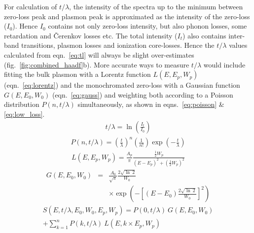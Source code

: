 \documentclass[%
aip,
rsi,%
 amsmath,amssymb,%
 reprint,%
]{revtex4-1}
\begin{document}
For calculation of $t/\lambda$, the intensity of the spectra up to the minimum between zero-loss peak and plasmon peak is approximated as the intensity of the zero-loss ($I_0$). Hence $I_0$ contains not only zero-loss intensity, but also phonon losses, some retardation and \v{C}erenkov losses etc. The total intensity ($I_t$) also contains inter-band transitions, plasmon losses and ionization core-losses. Hence the $t/\lambda$ values calculated from eqn.~\ref{eq:tl} will always be slight over-estimates (fig.~\ref{fig:combined_haadf}b). More accurate ways to measure $t/\lambda$ would include fitting the bulk plasmon with a Lorentz function $L(E,E_p,W_p)$ (eqn.~\ref{eq:lorentz}) and the monochromated zero-loss with a Gaussian function $G(E,E_0,W_0)$ (eqn.~\ref{eq:gauss}) and weighting both according to a Poisson distribution $P(n,t/\lambda)$ simultaneously, as shown in eqns.~\ref{eq:poisson} \& \ref{eq:low_loss}.
\begin{eqnarray}
	t/\lambda = \operatorname{ln}\left(\frac{I_t}{I_0}\right)
    \label{eq:tl}
\end{eqnarray}
\begin{eqnarray}
	P(n,t/\lambda) = \left(\frac{t}{\lambda}\right)^n\left(\frac{1}{n!}\right)\operatorname{exp}\left(-\frac{t}{\lambda}\right)
    \label{eq:poisson}
\end{eqnarray}
\begin{eqnarray}
	L(E,E_p,W_p) = \frac{A_p}{\pi} \frac{\frac{1}{2}W_p}{(E-E_p)^2+\left(\frac{1}{2}W_p\right)^2}
    \label{eq:lorentz}
\end{eqnarray}
\begin{eqnarray}
	G(E,E_0,W_0) &=& \frac{A_0}{\sqrt{\pi}}\frac{2\sqrt{\operatorname{ln}~2}}{W_0}\nonumber\\
    & & \times \operatorname{exp}\left(-\left[(E-E_0)\frac{2\sqrt{\operatorname{ln}~2}}{W_0}\right]^2\right)
    \label{eq:gauss}
\end{eqnarray}
\begin{eqnarray}
	S(E,t/\lambda,E_0,W_0,E_p,W_p) = P(0,t/\lambda)~G(E,E_0,W_0) \nonumber \\
     +\sum_{k=1}^{n}P(k,t/\lambda)~L(E,k\times E_p,W_p) \nonumber \\
    \label{eq:low_loss}
\end{eqnarray}
\end{document}
